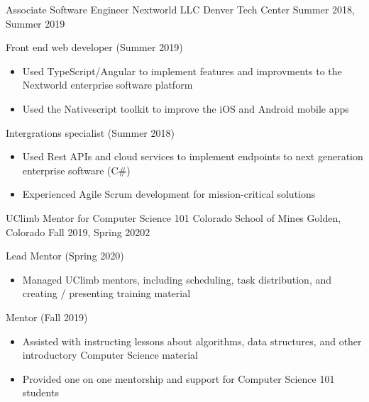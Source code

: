 \vspace{-2.0mm}

\begin{cventries}

  \cventry
    {Associate Software Engineer} %
    {Nextworld LLC} %
    {Denver Tech Center} %
    {Summer 2018, Summer 2019} %
    {
      \begin{cvitems} %
      \item {Front end web developer (Summer 2019)}
      \begin{itemize}
            \item {Used TypeScript/Angular to implement features and
    improvments to the Nextworld enterprise software platform}
        \item {Used the Nativescript toolkit to improve the iOS and
    Android mobile apps}
    \end{itemize}
        \item {Intergrations specialist (Summer 2018)}
        \begin{itemize}
                \item {Used Rest APIs and cloud services to implement
                            endpoints to next generation enterprise software (C\#)}
        \item {Experienced Agile Scrum
    development for mission-critical solutions}
    \end{itemize}
      \end{cvitems}
    }

    \cventry
    	{UClimb Mentor for Computer Science 101}
    	{ Colorado School of Mines }
    	{ Golden, Colorado}
	   	 {Fall 2019, Spring 20202  }
   	 {
   	 \begin{cvitems}
         \item {Lead Mentor (Spring 2020)}
         \begin{itemize}
         \item {Managed UClimb mentors, including scheduling, task
    	distribution, and creating /
    	presenting training material}
         \end{itemize}
         \item {Mentor (Fall 2019)}
         \begin{itemize}
            	 \item {Assisted with instructing lessons about algorithms, data structures, and other introductory Computer Science material}
   	         \item {Provided one on one mentorship and support for
    	Computer Science 101 students}
        \end{itemize}
    \end{cvitems}
    }


\end{cventries}
